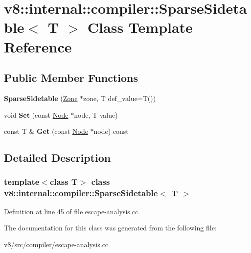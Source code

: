 \hypertarget{classv8_1_1internal_1_1compiler_1_1SparseSidetable}{}\section{v8\+:\+:internal\+:\+:compiler\+:\+:Sparse\+Sidetable$<$ T $>$ Class Template Reference}
\label{classv8_1_1internal_1_1compiler_1_1SparseSidetable}
\subsection*{Public Member Functions}
\begin{DoxyCompactItemize}
\item 
\mbox{\label{classv8_1_1internal_1_1compiler_1_1SparseSidetable_a540874d4259d9537cd8b22cbce37ba45}} 
{\bfseries Sparse\+Sidetable} (\mbox{\hyperlink{classv8_1_1internal_1_1Zone}{Zone}} $\ast$zone, T def\+\_\+value=T())
\item 
\mbox{\label{classv8_1_1internal_1_1compiler_1_1SparseSidetable_a361da768e975cac219a2b3f987c6a54c}} 
void {\bfseries Set} (const \mbox{\hyperlink{classv8_1_1internal_1_1compiler_1_1Node}{Node}} $\ast$node, T value)
\item 
\mbox{\label{classv8_1_1internal_1_1compiler_1_1SparseSidetable_ac2fc1f010c5b8692683573b532b1262f}} 
const T \& {\bfseries Get} (const \mbox{\hyperlink{classv8_1_1internal_1_1compiler_1_1Node}{Node}} $\ast$node) const
\end{DoxyCompactItemize}


\subsection{Detailed Description}
\subsubsection*{template$<$class T$>$\newline
class v8\+::internal\+::compiler\+::\+Sparse\+Sidetable$<$ T $>$}



Definition at line 45 of file escape-\/analysis.\+cc.



The documentation for this class was generated from the following file\+:\begin{DoxyCompactItemize}
\item 
v8/src/compiler/escape-\/analysis.\+cc\end{DoxyCompactItemize}
